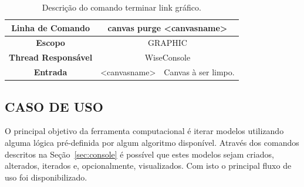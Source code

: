 \documentclass[a4paper,12pt]{monografia}
\theoremstyle{plain}
\theoremstyle{definition}
\theoremstyle{remark}
\begin{document}
\begin{center}
	\begin{table}[!htbp]
		\begin{tabular}{|c|c|m{}|}
			\hline
			\textbf{Linha de Comando} & \multicolumn{2}{c|}{canvas purge <canvas\underline{\space\space}name>} \\
			\hline
			\textbf{Escopo} & \multicolumn{2}{c|}{GRAPHIC} \\
			\hline
			\textbf{Thread Responsável} & \multicolumn{2}{c|}{WiseConsole} \\
			\hline
			\textbf{Entrada} & <canvas\underline{\space\space}name> & Canvas à ser limpo. \\
			\hline
		\end{tabular}
		\caption{Descrição do comando terminar link gráfico.}
		\label{tab:graphic_purge}
	\end{table}
\end{center}

\subsection{CASO DE USO}\label{sec:caso_de_uso}

O principal objetivo da ferramenta computacional é iterar modelos utilizando alguma lógica pré-definida por algum algoritmo disponível. Através dos comandos descritos na Seção~\ref{sec:console} é possível que estes modelos sejam criados, alterados, iterados e, opcionalmente, visualizados. Com isto o principal fluxo de uso foi disponibilizado.
\end{document}
